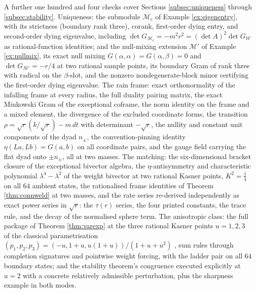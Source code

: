\documentclass[11pt]{article}
\theoremstyle{definition}
\newcommand{\shW}{\mathcal{W}}
\newcommand{\dtPG}{dt}
\begin{document}
A further one hundred and four checks cover Sections \ref{subsec:uniqueness} through \ref{subsec:stability}. Uniqueness: the submodule $\mathcal{M}_c$ of Example \ref{ex:eigenentry}, with its strictness (boundary rank three), corank, first-order dying entry, and second-order dying eigenvalue, including $\det G_{\mathcal{M}_c} = -m^2r^2 = (\det A)^2\det G_{\shW}$ as rational-function identities; and the null-mixing extension $\mathcal{M}'$ of Example \ref{ex:nullmix}, its exact null mixing $G(\alpha,\alpha) = G(\alpha,\beta) = 0$ and $\det G_{\mathcal{M}'} = -r/4$ at two rational sample points, its boundary Gram of rank three with radical on the $\beta$-slot, and the nonzero nondegenerate-block minor certifying the first-order dying eigenvalue. The rain frame: exact orthonormality of the infalling frame at every radius, the full duality pairing matrix, the exact Minkowski Gram of the exceptional coframe, the norm identity on the frame and a mixed element, the divergence of the excluded coordinate forms, the transition $\rho = \sqrt r(k/\sqrt r) - m\,\dtPG$ with determinant $-\sqrt r$, the nullity and constant unit components of the dyad $n_\pm$, the convention-pinning identity $\eta(La,Lb) = G(a,b)$ on all coordinate pairs, and the gauge field carrying the flat dyad onto $\pm n_\pm$, all at two masses. The matching: the six-dimensional bracket closure of the exceptional bivector algebra, the $\eta$-antisymmetry and characteristic polynomial $\lambda^4 - \lambda^2$ of the weight bivector at two rational Kasner points, $K^2 = \tfrac14$ on all $64$ ambient states, the rationalised frame identities of Theorem \ref{thm:connweld} at two masses, and the rate series re-derived independently as exact power series in $\sqrt r$: the $\tau(r)$ series, the four printed constants, the trace rule, and the decay of the normalised sphere term. The anisotropic class: the full package of Theorem \ref{thm:varexp} at the three rational Kasner points $u = 1, 2, 3$ of the classical parametrisation $(p_1,p_2,p_3) = (-u, 1+u, u(1+u))/(1+u+u^2)$ \cite{Kasner1921}, sum rules through completion signatures and pointwise weight forcing, with the ladder pair on all $64$ boundary states; and the stability theorem's congruence executed explicitly at $u = 2$ with a concrete relatively admissible perturbation, plus the sharpness example in both modes.
\end{document}
